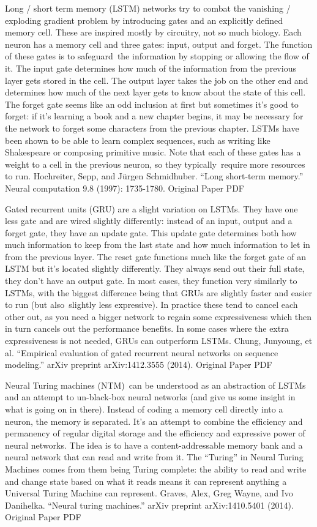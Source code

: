 \documentclass[11pt,a4paper,oneside]{ctexbook}
\begin{document}
Long / short term memory (LSTM) networks try to combat the vanishing / exploding gradient problem by introducing gates and an explicitly defined memory cell. These are inspired mostly by circuitry, not so much biology. Each neuron has a memory cell and three gates: input, output and forget. The function of these gates is to safeguard the information by stopping or allowing the flow of it. The input gate determines how much of the information from the previous layer gets stored in the cell. The output layer takes the job on the other end and determines how much of the next layer gets to know about the state of this cell. The forget gate seems like an odd inclusion at first but sometimes it’s good to forget: if it’s learning a book and a new chapter begins, it may be necessary for the network to forget some characters from the previous chapter. LSTMs have been shown to be able to learn complex sequences, such as writing like Shakespeare or composing primitive music. Note that each of these gates has a weight to a cell in the previous neuron, so they typically require more resources to run.
Hochreiter, Sepp, and Jürgen Schmidhuber. “Long short-term memory.” Neural computation 9.8 (1997): 1735-1780.
Original Paper PDF


Gated recurrent units (GRU) are a slight variation on LSTMs. They have one less gate and are wired slightly differently: instead of an input, output and a forget gate, they have an update gate. This update gate determines both how much information to keep from the last state and how much information to let in from the previous layer. The reset gate functions much like the forget gate of an LSTM but it’s located slightly differently. They always send out their full state, they don’t have an output gate. In most cases, they function very similarly to LSTMs, with the biggest difference being that GRUs are slightly faster and easier to run (but also slightly less expressive). In practice these tend to cancel each other out, as you need a bigger network to regain some expressiveness which then in turn cancels out the performance benefits. In some cases where the extra expressiveness is not needed, GRUs can outperform LSTMs.
Chung, Junyoung, et al. “Empirical evaluation of gated recurrent neural networks on sequence modeling.” arXiv preprint arXiv:1412.3555 (2014).
Original Paper PDF



Neural Turing machines (NTM) can be understood as an abstraction of LSTMs and an attempt to un-black-box neural networks (and give us some insight in what is going on in there). Instead of coding a memory cell directly into a neuron, the memory is separated. It’s an attempt to combine the efficiency and permanency of regular digital storage and the efficiency and expressive power of neural networks. The idea is to have a content-addressable memory bank and a neural network that can read and write from it. The “Turing” in Neural Turing Machines comes from them being Turing complete: the ability to read and write and change state based on what it reads means it can represent anything a Universal Turing Machine can represent.
Graves, Alex, Greg Wayne, and Ivo Danihelka. “Neural turing machines.” arXiv preprint arXiv:1410.5401 (2014).
Original Paper PDF
\end{document}
